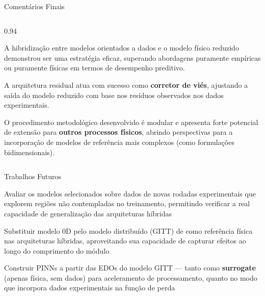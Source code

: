 \begin{slide}{Comentários Finais}
  \footnotesize
  \begin{columns}
    \begin{column}{0.94\linewidth}
    \begin{Item}[0.10]
    \item A hibridização entre modelos orientados a dados e o modelo físico reduzido demonstrou ser uma estratégia eficaz, superando abordagens puramente empíricas ou puramente físicas em termos de desempenho preditivo.
    \item A arquitetura residual atua com sucesso como \textbf{corretor de viés}, ajustando a saída do modelo reduzido com base nos resíduos observados nos dados experimentais.
    \item O procedimento metodológico desenvolvido é modular e apresenta forte potencial de extensão para \textbf{outros processos físicos}, abrindo perspectivas para a incorporação de modelos de referência mais complexos (como formulações bidimensionais).
    \end{Item}
    \end{column}
  \end{columns}
\end{slide}

\begin{slide}{Trabalhos Futuros}
  \begin{Item}
    \item Avaliar os modelos selecionados sobre dados de novas rodadas experimentais que explorem regiões não contempladas no treinamento, permitindo verificar a real capacidade de generalização das arquiteturas híbridas
    \item Substituir modelo 0D pelo modelo distribuído (GITT) de \cite{Curcino2026} como referência física nas arquiteturas híbridas, aproveitando sua capacidade de capturar efeitos ao longo do comprimento do módulo
    \item Construir PINNs a partir das EDOs do modelo GITT — tanto como \textbf{surrogate} (apenas física, sem dados) para aceleramento de processamento, quanto no modo que incorpora dados experimentais na função de perda
  \end{Item}
\end{slide}
